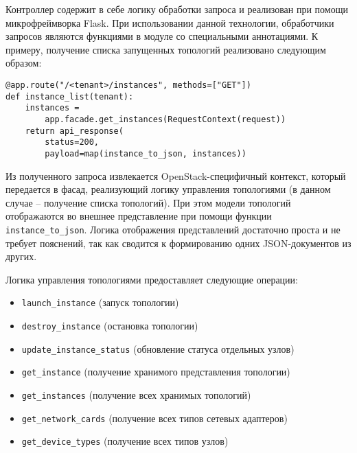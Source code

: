 Контроллер содержит в себе логику обработки запроса и реализован при помощи микрофреймворка
Flask. При использовании данной технологии, обработчики запросов являются функциями в модуле
со специальными аннотациями. К примеру, получение списка запущенных топологий реализовано
следующим образом:
\begin{lstlisting}
@app.route("/<tenant>/instances", methods=["GET"])
def instance_list(tenant):
    instances = 
        app.facade.get_instances(RequestContext(request))
    return api_response(
        status=200, 
        payload=map(instance_to_json, instances))
\end{lstlisting}
Из полученного запроса извлекается OpenStack-специфичный контекст, который передается
в фасад, реализующий логику управления топологиями (в данном случае -- получение списка 
топологий). При этом модели топологий отображаются во внешнее представление
при помощи функции \verb`instance_to_json`. Логика отображения представлений достаточно
проста и не требует пояснений, так как сводится к формированию одних JSON-документов из других.

Логика управления топологиями предоставляет следующие операции:
\begin{itemize}
    \item \verb`launch_instance` (запуск топологии)
    \item \verb`destroy_instance` (остановка топологии)
    \item \verb`update_instance_status` (обновление статуса отдельных узлов)
    \item \verb`get_instance` (получение хранимого представления топологии)
    \item \verb`get_instances` (получение всех хранимых топологий)
    \item \verb`get_network_cards` (получение всех типов сетевых адаптеров)
    \item \verb`get_device_types` (получение всех типов узлов)
\end{itemize}

